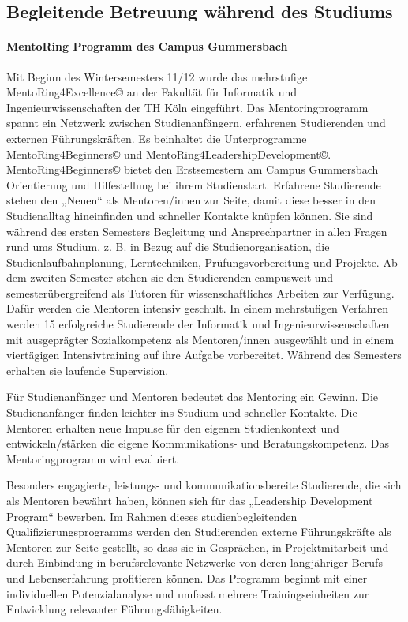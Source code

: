 \subsection{Begleitende Betreuung während des
Studiums}\label{begleitende-betreuung-wuxe4hrend-des-studiums}

\paragraph{MentoRing Programm des Campus
Gummersbach}\label{mentoring-programm-des-campus-gummersbach}

Mit Beginn des Wintersemesters 11/12 wurde das mehrstufige
MentoRing4Excellence© an der Fakultät für Informatik und
Ingenieurwissenschaften der TH Köln eingeführt. Das Mentoringprogramm
spannt ein Netzwerk zwischen Studienanfängern, erfahrenen Studierenden
und externen Führungskräften. Es beinhaltet die Unterprogramme
MentoRing4Beginners© und MentoRing4LeadershipDevelopment©.
MentoRing4Beginners© bietet den Erstsemestern am Campus Gummersbach
Orientierung und Hilfestellung bei ihrem Studienstart. Erfahrene
Studierende stehen den „Neuen`` als Mentoren/innen zur Seite, damit
diese besser in den Studienalltag hineinfinden und schneller Kontakte
knüpfen können. Sie sind während des ersten Semesters Begleitung und
Ansprechpartner in allen Fragen rund ums Studium, z. B. in Bezug auf die
Studienorganisation, die Studienlaufbahnplanung, Lerntechniken,
Prüfungsvorbereitung und Projekte. Ab dem zweiten Semester stehen sie
den Studierenden campusweit und semesterübergreifend als Tutoren für
wissenschaftliches Arbeiten zur Verfügung. Dafür werden die Mentoren
intensiv geschult. In einem mehrstufigen Verfahren werden 15
erfolgreiche Studierende der Informatik und Ingenieurwissenschaften mit
ausgeprägter Sozialkompetenz als Mentoren/innen ausgewählt und in einem
viertägigen Intensivtraining auf ihre Aufgabe vorbereitet. Während des
Semesters erhalten sie laufende Supervision.

Für Studienanfänger und Mentoren bedeutet das Mentoring ein Gewinn. Die
Studienanfänger finden leichter ins Studium und schneller Kontakte. Die
Mentoren erhalten neue Impulse für den eigenen Studienkontext und
entwickeln/stärken die eigene Kommunikations- und Beratungskompetenz.
Das Mentoringprogramm wird evaluiert.

Besonders engagierte, leistungs- und kommunikationsbereite Studierende,
die sich als Mentoren bewährt haben, können sich für das „Leadership
Development Program`` bewerben. Im Rahmen dieses studienbegleitenden
Qualifizierungsprogramms werden den Studierenden externe Führungskräfte
als Mentoren zur Seite gestellt, so dass sie in Gesprächen, in
Projektmitarbeit und durch Einbindung in berufsrelevante Netzwerke von
deren langjähriger Berufs- und Lebenserfahrung profitieren können. Das
Programm beginnt mit einer individuellen Potenzialanalyse und umfasst
mehrere Trainingseinheiten zur Entwicklung relevanter
Führungsfähigkeiten.

